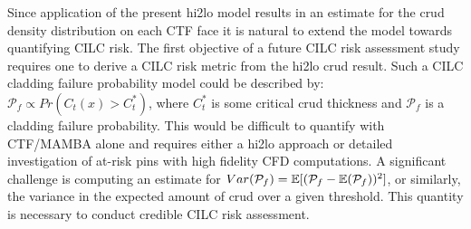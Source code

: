 Since application of the present hi2lo model results in an estimate for the crud density distribution on each CTF face it is natural to extend the model towards quantifying CILC risk.  The first objective of a future CILC risk assessment study requires one to derive a CILC risk metric from the hi2lo crud result.  Such a CILC cladding failure probability model could be described by: $\mathcal P_f \propto Pr(C_t(x) > C_t^*)$, where $C_t^*$ is some critical crud thickness and $\mathcal P_f$ is a cladding failure probability.  This would be difficult to quantify with CTF/MAMBA alone and requires either a hi2lo approach or detailed investigation of at-risk pins with high fidelity CFD computations.  A significant challenge is computing an estimate for $Var(\mathcal P_f) = \operatorname*{\mathbb{E}}[(\mathcal P_f - \operatorname*{\mathbb{E}}(\mathcal P_f))^2]$, or similarly, the variance in the expected amount of crud over a given threshold.  This quantity is necessary to conduct credible CILC risk assessment.





